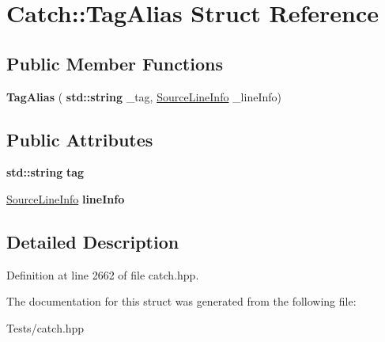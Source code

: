 \hypertarget{struct_catch_1_1_tag_alias}{}\section{Catch\+:\+:Tag\+Alias Struct Reference}
\label{struct_catch_1_1_tag_alias}
\subsection*{Public Member Functions}
\begin{DoxyCompactItemize}
\item 
\mbox{\label{struct_catch_1_1_tag_alias_ad9124d03bfb6f767f1c97572330b05bc}} 
{\bfseries Tag\+Alias} (\textbf{ std\+::string} \+\_\+tag, \hyperlink{struct_catch_1_1_source_line_info}{Source\+Line\+Info} \+\_\+line\+Info)
\end{DoxyCompactItemize}
\subsection*{Public Attributes}
\begin{DoxyCompactItemize}
\item 
\mbox{\label{struct_catch_1_1_tag_alias_a950183883ab17c90d0fab16b966b6e2d}} 
\textbf{ std\+::string} {\bfseries tag}
\item 
\mbox{\label{struct_catch_1_1_tag_alias_a2f51fe0b3c052561275d26b6eb88f702}} 
\hyperlink{struct_catch_1_1_source_line_info}{Source\+Line\+Info} {\bfseries line\+Info}
\end{DoxyCompactItemize}


\subsection{Detailed Description}


Definition at line 2662 of file catch.\+hpp.



The documentation for this struct was generated from the following file\+:\begin{DoxyCompactItemize}
\item 
Tests/catch.\+hpp\end{DoxyCompactItemize}
